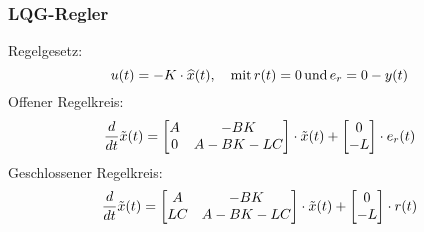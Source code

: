     \subsubsection{LQG-Regler}
        Regelgesetz:
        \begin{equation*}
            u(t) = -K\cdot\widehat{x}(t),\quad\textnormal{mit}\, r(t) = 0\,\textnormal{und}\, e_r = 0-y(t)
        \end{equation*}
        Offener Regelkreis:
        \begin{equation*}
            \frac{d}{dt}\Tilde{x}(t) = 
            \begin{bmatrix}
            A   & -BK\\
            0   &   A-BK-LC
            \end{bmatrix}\cdot\Tilde{x}(t) +
            \begin{bmatrix} 0\\ -L\end{bmatrix}\cdot e_r(t)
        \end{equation*}
        Geschlossener Regelkreis:
        \begin{equation*}
            \frac{d}{dt}\Tilde{x}(t) = 
            \begin{bmatrix}
            A   & -BK\\
            LC   &   A-BK-LC
            \end{bmatrix}\cdot\Tilde{x}(t) +
            \begin{bmatrix} 0\\ -L\end{bmatrix}\cdot r(t)
        \end{equation*}
        
